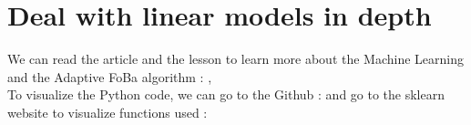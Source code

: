 \documentclass{article}
\begin{document}

\section{Deal with linear models in depth}
\label{sec:pour_aller_plus_loin_sur_ce_theme}

We can read the article and the lesson to learn more about the Machine Learning and the Adaptive FoBa algorithm :
\cite{Article}, \cite{Teaching}\\
To visualize the Python code, we can go to the Github :
\cite{code} and go to the sklearn website to visualize functions used : \cite{algo} 

\newpage


\end{document}
